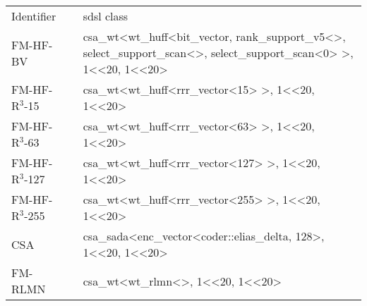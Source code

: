 \renewcommand{\arraystretch}{1.3}%
\begin{tabular}{llp{8cm}}
  \toprule Identifier&&sdsl class\\\cmidrule{1-1}\cmidrule{3-3} FM-HF-BV &  & csa\_wt{\textless}wt\_huff{\textless}bit\_vector, rank\_support\_v5{\textless}{\textgreater}, select\_support\_scan{\textless}{\textgreater}, select\_support\_scan{\textless}0{\textgreater} {\textgreater}, 1{\textless}{\textless}20, 1{\textless}{\textless}20{\textgreater} \\ 
  FM-HF-R$^{3}$-15 &  & csa\_wt{\textless}wt\_huff{\textless}rrr\_vector{\textless}15{\textgreater} {\textgreater}, 1{\textless}{\textless}20, 1{\textless}{\textless}20{\textgreater} \\ 
  FM-HF-R$^{3}$-63 &  & csa\_wt{\textless}wt\_huff{\textless}rrr\_vector{\textless}63{\textgreater} {\textgreater}, 1{\textless}{\textless}20, 1{\textless}{\textless}20{\textgreater} \\ 
  FM-HF-R$^{3}$-127 &  & csa\_wt{\textless}wt\_huff{\textless}rrr\_vector{\textless}127{\textgreater} {\textgreater}, 1{\textless}{\textless}20, 1{\textless}{\textless}20{\textgreater} \\ 
  FM-HF-R$^{3}$-255 &  & csa\_wt{\textless}wt\_huff{\textless}rrr\_vector{\textless}255{\textgreater} {\textgreater}, 1{\textless}{\textless}20, 1{\textless}{\textless}20{\textgreater} \\ 
  CSA &  & csa\_sada{\textless}enc\_vector{\textless}coder::elias\_delta, 128{\textgreater}, 1{\textless}{\textless}20, 1{\textless}{\textless}20{\textgreater} \\ 
  FM-RLMN &  & csa\_wt{\textless}wt\_rlmn{\textless}{\textgreater}, 1{\textless}{\textless}20, 1{\textless}{\textless}20{\textgreater} \\ 
   \bottomrule\end{tabular}
